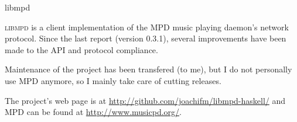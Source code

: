 \begin{hcarentry}{libmpd}
\makeheader

\textsc{libmpd} is a client implementation of the MPD music playing
daemon's network protocol. Since the last report (version 0.3.1), several
improvements have been made to the API and protocol compliance.

Maintenance of the project has been transfered (to me), but I do not
personally use MPD anymore, so I mainly take care of cutting releases.

\FurtherReading
The project's web page is at \url{http://github.com/joachifm/libmpd-haskell/}
and MPD can be found at \url{http://www.musicpd.org/}.
\end{hcarentry}
